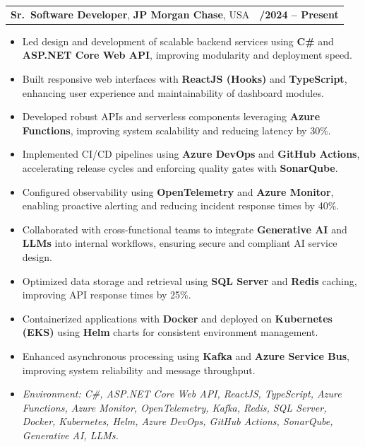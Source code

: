 \documentclass[letterpaper,11pt]{article}
\makeatletter
\newcommand{\resumeItem}[1]{
  \item\footnotesize{
    {#1 \vspace{-2pt}}
  }
}
\newcommand{\resumeSubheading}[4]{
  \vspace{-2pt}\item
    \begin{tabular*}{1.0\textwidth}[t]{l@{\extracolsep{\fill}}r}
      \textbf{\fontsize{10pt}{14pt}\selectfont #3}, \textbf{\fontsize{10pt}{14pt}\selectfont #1}, \fontsize{10pt}{14pt}\selectfont #4 & \textbf{\fontsize{10pt}{14pt}\selectfont #2} \\
    \end{tabular*}\vspace{-7pt}
}
\newcommand{\resumeItemListStart}{\begin{itemize}[leftmargin=*]}
\newcommand{\resumeItemListEnd}{\end{itemize}\vspace{-5pt}}
\makeatother
\begin{document}
\resumeSubheading
{JP Morgan Chase}{09/2024 -- Present}
{Sr.\ Software Developer}{USA}
\resumeItemListStart
  \resumeItem{Led design and development of scalable backend services using \textbf{C\#} and \textbf{ASP.NET Core Web API}, improving modularity and deployment speed.}
  \resumeItem{Built responsive web interfaces with \textbf{ReactJS (Hooks)} and \textbf{TypeScript}, enhancing user experience and maintainability of dashboard modules.}
  \resumeItem{Developed robust APIs and serverless components leveraging \textbf{Azure Functions}, improving system scalability and reducing latency by 30\%.}
  \resumeItem{Implemented CI/CD pipelines using \textbf{Azure DevOps} and \textbf{GitHub Actions}, accelerating release cycles and enforcing quality gates with \textbf{SonarQube}.}
  \resumeItem{Configured observability using \textbf{OpenTelemetry} and \textbf{Azure Monitor}, enabling proactive alerting and reducing incident response times by 40\%.}
  \resumeItem{Collaborated with cross-functional teams to integrate \textbf{Generative AI} and \textbf{LLMs} into internal workflows, ensuring secure and compliant AI service design.}
  \resumeItem{Optimized data storage and retrieval using \textbf{SQL Server} and \textbf{Redis} caching, improving API response times by 25\%.}
  \resumeItem{Containerized applications with \textbf{Docker} and deployed on \textbf{Kubernetes (EKS)} using \textbf{Helm} charts for consistent environment management.}
  \resumeItem{Enhanced asynchronous processing using \textbf{Kafka} and \textbf{Azure Service Bus}, improving system reliability and message throughput.}
  \resumeItem{\textit{Environment: C\#, ASP.NET Core Web API, ReactJS, TypeScript, Azure Functions, Azure Monitor, OpenTelemetry, Kafka, Redis, SQL Server, Docker, Kubernetes, Helm, Azure DevOps, GitHub Actions, SonarQube, Generative AI, LLMs.}}
\resumeItemListEnd
\end{document}
